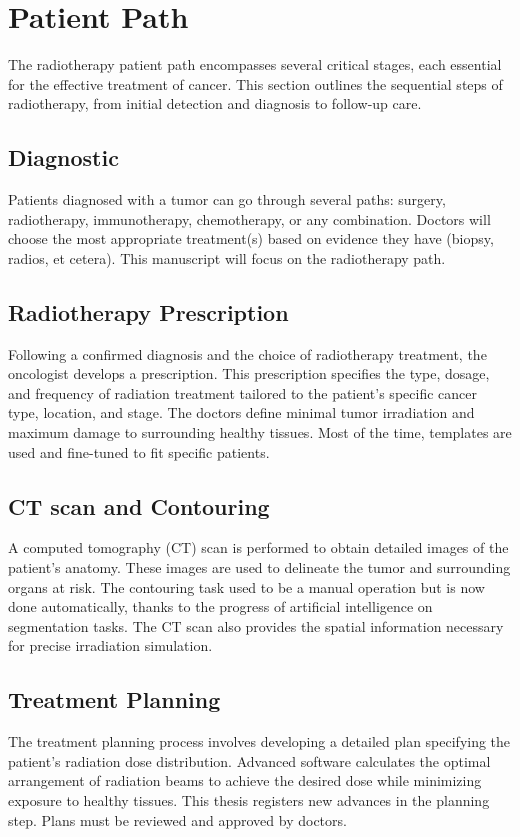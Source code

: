 \section{Patient Path}
The radiotherapy patient path encompasses several critical stages, each essential for the effective treatment of cancer.
This section outlines the sequential steps of radiotherapy, from initial detection and diagnosis to follow-up care.

\subsection{Diagnostic}
Patients diagnosed with a tumor can go through several paths: surgery, radiotherapy, immunotherapy, chemotherapy, or any combination.
Doctors will choose the most appropriate treatment(s) based on evidence they have (biopsy, radios, et cetera).
This manuscript will focus on the radiotherapy path.

\subsection{Radiotherapy Prescription}
Following a confirmed diagnosis and the choice of radiotherapy treatment, the oncologist develops a prescription.
This prescription specifies the type, dosage, and frequency of radiation treatment tailored to the patient's specific cancer type, location, and stage.
The doctors define minimal tumor irradiation and maximum damage to surrounding healthy tissues.
Most of the time, templates are used and fine-tuned to fit specific patients.

\subsection{CT scan and Contouring}
A computed tomography (CT) scan is performed to obtain detailed images of the patient's anatomy.
These images are used to delineate the tumor and surrounding organs at risk.
The contouring task used to be a manual operation but is now done automatically, thanks to the progress of artificial intelligence on segmentation tasks.
The CT scan also provides the spatial information necessary for precise irradiation simulation.

\subsection{Treatment Planning}
The treatment planning process involves developing a detailed plan specifying the patient's radiation dose distribution.
Advanced software calculates the optimal arrangement of radiation beams to achieve the desired dose while minimizing exposure to healthy tissues.
This thesis registers new advances in the planning step.
Plans must be reviewed and approved by doctors.

